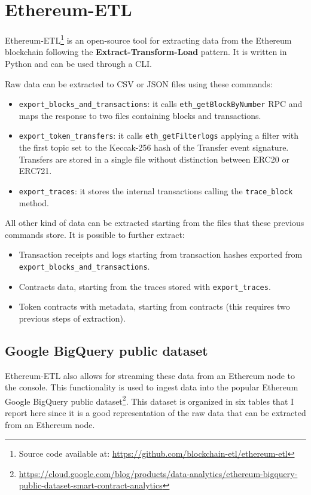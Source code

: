 \section{Ethereum-ETL}

Ethereum-ETL\footnote{Source code available at: \url{https://github.com/blockchain-etl/ethereum-etl}} is an open-source tool for extracting data from the Ethereum blockchain following the \textbf{Extract-Transform-Load} pattern. It is written in Python and can be used through a CLI.

\noindent Raw data can be extracted to CSV or JSON files using these commands:

\begin{itemize}
    \item \verb|export_blocks_and_transactions|: it calls \verb|eth_getBlockByNumber| RPC and maps the response to two files containing blocks and transactions.
    \item \verb|export_token_transfers|: it calls \verb|eth_getFilterlogs| applying a filter with the first topic set to the Keccak-256 hash of the Transfer event signature. Transfers are stored in a single file without distinction between ERC20 or ERC721.   
    \item \verb|export_traces|: it stores the internal transactions calling the \verb|trace_block| method.
\end{itemize}

\noindent All other kind of data can be extracted starting from the files that these previous commands store. It is possible to further extract:

\begin{itemize}
    \item Transaction receipts and logs starting from transaction hashes exported from \verb|export_blocks_and_transactions|.
    \item Contracts data, starting from the traces stored with \verb|export_traces|.
    \item Token contracts with metadata, starting from contracts (this requires two previous steps of extraction). 
\end{itemize}

\subsection{Google BigQuery public dataset}

\noindent Ethereum-ETL also allows for streaming these data from an Ethereum node to the console. This functionality is used to ingest data into the popular Ethereum Google BigQuery public dataset\footnote{\url{https://cloud.google.com/blog/products/data-analytics/ethereum-bigquery-public-dataset-smart-contract-analytics}}. This dataset is organized in six tables that I report here since it is a good representation of the raw data that can be extracted from an Ethereum node.

